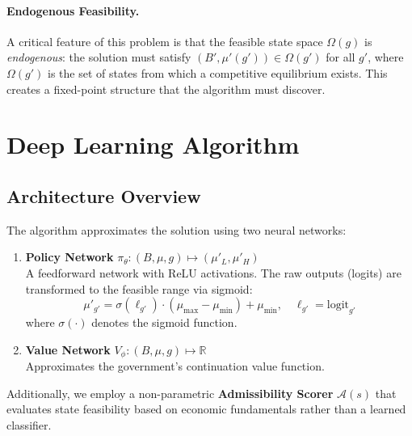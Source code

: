 \paragraph{Endogenous Feasibility.}
A critical feature of this problem is that the feasible state space $\Omega(g)$ is \textit{endogenous}: the solution must satisfy $(B', \mu'(g')) \in \Omega(g')$ for all $g'$, where $\Omega(g')$ is the set of states from which a competitive equilibrium exists. This creates a fixed-point structure that the algorithm must discover.


\section{Deep Learning Algorithm}

\subsection{Architecture Overview}

The algorithm approximates the solution using two neural networks:

\begin{enumerate}
    \item \textbf{Policy Network} $\pi_\theta: (B, \mu, g) \mapsto (\mu'_L, \mu'_H)$ \\
    A feedforward network with ReLU activations. The raw outputs (logits) are transformed to the feasible range via sigmoid:
    \begin{equation}\label{eq:policy_transform}
        \mu'_{g'} = \sigma(\ell_{g'}) \cdot (\mu_{\max} - \mu_{\min}) + \mu_{\min}, \quad \ell_{g'} = \text{logit}_{g'}
    \end{equation}
    where $\sigma(\cdot)$ denotes the sigmoid function.
    
    \item \textbf{Value Network} $V_\phi: (B, \mu, g) \mapsto \mathbb{R}$ \\
    Approximates the government's continuation value function.
\end{enumerate}

Additionally, we employ a non-parametric \textbf{Admissibility Scorer} $\mathcal{A}(s)$ that evaluates state feasibility based on economic fundamentals rather than a learned classifier.


